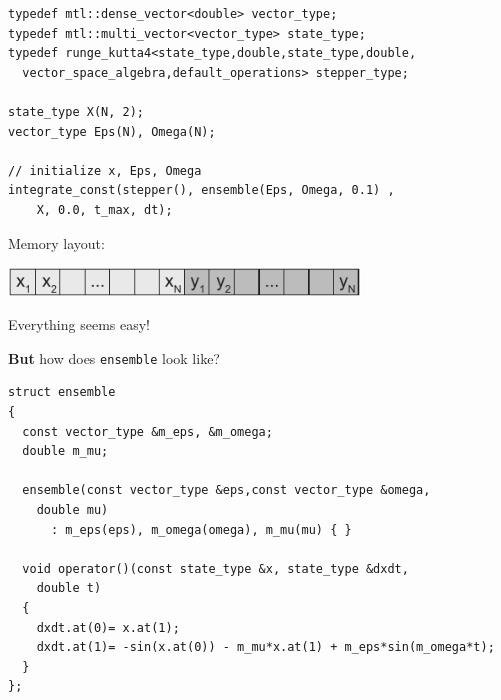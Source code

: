 
\begin{frame}[fragile]


 \begin{lstlisting}[basicstyle=\scriptsize\ttfamily]
typedef mtl::dense_vector<double> vector_type;
typedef mtl::multi_vector<vector_type> state_type;
typedef runge_kutta4<state_type,double,state_type,double,
  vector_space_algebra,default_operations> stepper_type;

state_type X(N, 2);
vector_type Eps(N), Omega(N);

// initialize x, Eps, Omega
integrate_const(stepper(), ensemble(Eps, Omega, 0.1) ,
    X, 0.0, t_max, dt);
 \end{lstlisting}

\vspace{2ex}

\centerline{Memory layout:}

\vspace{1ex}

\centerline{\includegraphics[draft=false,width=0.7\textwidth]{memory_layout2.pdf}}

\vspace{2ex}

\centerline{Everything seems easy!}
\vspace{2ex}
\centerline{{\bf But} how does {\tt ensemble} look like?}
 

\end{frame}




\begin{frame}[fragile]


 \begin{lstlisting}[basicstyle=\scriptsize\ttfamily]
struct ensemble
{
  const vector_type &m_eps, &m_omega;
  double m_mu;

  ensemble(const vector_type &eps,const vector_type &omega,
    double mu)
      : m_eps(eps), m_omega(omega), m_mu(mu) { }

  void operator()(const state_type &x, state_type &dxdt,
    double t)
  {
    dxdt.at(0)= x.at(1);
    dxdt.at(1)= -sin(x.at(0)) - m_mu*x.at(1) + m_eps*sin(m_omega*t);
  }
};
 \end{lstlisting}

\end{frame}

